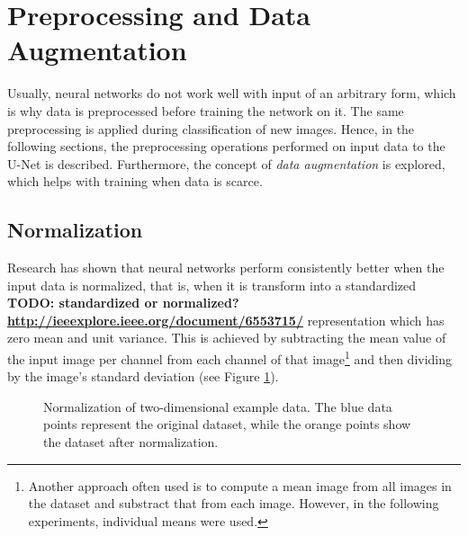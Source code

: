 	\section {Preprocessing and Data Augmentation}
Usually, neural networks do not work well with input of an arbitrary form, which is why data is preprocessed before training the network on it. The same preprocessing is applied during classification of new images. Hence, in the following sections, the preprocessing operations performed on input data to the U-Net is described. Furthermore, the concept of \textit{data augmentation} is explored, which helps with training when data is scarce.


		\subsection{Normalization}
Research \cite{lecun_norm} has shown that neural networks perform consistently better when the input data is normalized, that is, when it is transform into a standardized \textbf{TODO: standardized or normalized? \url{http://ieeexplore.ieee.org/document/6553715/}} representation which has zero mean and unit variance. This is achieved by subtracting the mean value of the input image per channel from each channel of that image\footnote{Another approach often used is to compute a mean image from all images in the dataset and substract that from each image. However, in the following experiments, individual means were used.} and then dividing by the image's standard deviation (see Figure \ref{fig:norma}).

\begin {figure}[!ht]
	\begin{center}
		\scalebox{0.5}{}
	\end{center}
	\caption[]{Normalization of two-dimensional example data. The blue data points represent the original dataset, while the orange points show the dataset after normalization.}
	\label{fig:norma}
\end {figure}


